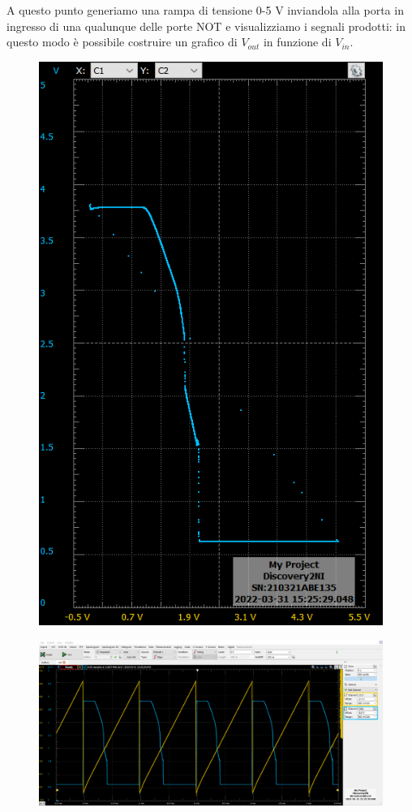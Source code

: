 \documentclass[10pt, a4paper, italian]{article}
\begin{document}
A questo punto generiamo una rampa di tensione 0-5 V inviandola alla porta in ingresso di una qualunque delle porte NOT e visualizziamo i segnali prodotti:
in questo modo è possibile costruire un grafico di $V_{out}$ in funzione di $V_{in}$.\\
\begin{figure}
	\includegraphics[scale=0.4]{not_xy1}
\end{figure}
\begin{figure}
	\includegraphics[width=\textwidth]{not_time1}
\end{figure}
\end{document}
